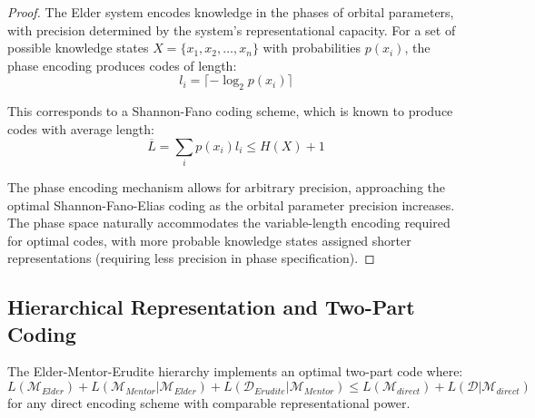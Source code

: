 \begin{proof}
The Elder system encodes knowledge in the phases of orbital parameters, with precision determined by the system's representational capacity. For a set of possible knowledge states $X = \{x_1, x_2, \ldots, x_n\}$ with probabilities $p(x_i)$, the phase encoding produces codes of length:
\begin{equation}
l_i = \lceil -\log_2 p(x_i) \rceil
\end{equation}

This corresponds to a Shannon-Fano coding scheme, which is known to produce codes with average length:
\begin{equation}
\overline{L} = \sum_i p(x_i) l_i \leq H(X) + 1
\end{equation}

The phase encoding mechanism allows for arbitrary precision, approaching the optimal Shannon-Fano-Elias coding as the orbital parameter precision increases. The phase space naturally accommodates the variable-length encoding required for optimal codes, with more probable knowledge states assigned shorter representations (requiring less precision in phase specification).
\end{proof}

\subsection{Hierarchical Representation and Two-Part Coding}

\begin{theorem}
The Elder-Mentor-Erudite hierarchy implements an optimal two-part code where:
\begin{equation}
L(\mathcal{M}_{Elder}) + L(\mathcal{M}_{Mentor} | \mathcal{M}_{Elder}) + L(\mathcal{D}_{Erudite} | \mathcal{M}_{Mentor}) \leq L(\mathcal{M}_{direct}) + L(\mathcal{D} | \mathcal{M}_{direct})
\end{equation}
for any direct encoding scheme with comparable representational power.
\end{theorem}

